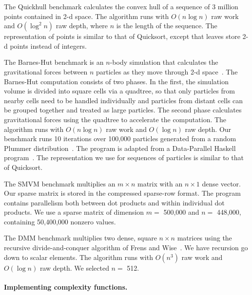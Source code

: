 The Quickhull benchmark calculates the convex hull of a sequence of
3 million points contained in 2-d space. The algorithm runs with $O(n
\log n)$ raw work and $O(\log^2 n)$ raw depth, where $n$ is the length
of the sequence. The representation of points is similar to that of
Quicksort, except that leaves store 2-d points instead of integers.

The Barnes-Hut benchmark is an $n$-body simulation that calculates the
gravitational forces between $n$ particles as they move through 2-d
space~\cite{barnes-hut}. The Barnes-Hut computation consists of two
phases. In the first, the simulation volume is divided into square
cells via a quadtree, so that only particles from nearby cells need to
be handled individually and particles from distant cells can be
grouped together and treated as large particles. The second phase
calculates gravitational forces using the quadtree to accelerate the
computation. The algorithm runs with $O(n \log n)$ raw work and
$O(\log n)$ raw depth. Our benchmark runs 10 iterations over 100,000
particles generated from a random Plummer
distribution~\cite{plummer-distribution}. The program is adapted from
a Data-Parallel Haskell
program~\cite{PeytonJonesHarnessingMulticores}. The representation we
use for sequences of particles is similar to that of Quicksort.

The SMVM benchmark multiplies an $m \times n$ matrix with an $n \times
1$ dense vector. Our sparse matrix is stored in the compressed
sparse-row format. The program contains parallelism both between dot
products and within individual dot products. We use a sparse matrix
of dimension $m =$ 500,000 and $n =$ 448,000, containing 50,400,000
nonzero values.

The DMM benchmark multiplies two dense, square $n \times n$ matrices
using the recursive divide-and-conquer algorithm of Frens and
Wise~\cite{FrensWiseAutoblockingDMM}. We have recursion go down to
scalar elements. The algorithm runs with $O(n^3)$ raw work and $O(\log
n)$ raw depth. We selected $n=$ 512.

\paragraph{Implementing complexity functions.}


